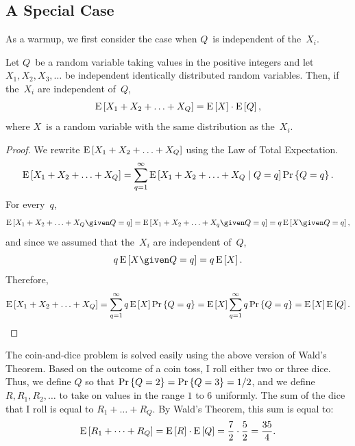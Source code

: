 \documentclass[11pt,twoside]{article}
\begin{document}
\subsection{A Special Case}

As a warmup, we first consider the case when $Q$~is independent of
the~$X_i$.
\begin{theorem}
  Let $Q$~be a random variable taking values in the positive integers
  and let $X_1, X_2, X_3, \ldots$ be independent identically
  distributed random variables. Then, if the~$X_i$ are independent
  of~$Q$,
  \begin{displaymath}
    \mathop{\textup{E}}\nolimits\left[X_1 + X_2 + \ldots + X_Q\right] = \mathop{\textup{E}}\nolimits\left[X\right] \cdot \mathop{\textup{E}}\nolimits\left[Q\right],
  \end{displaymath}
  where $X$~is a random variable with the same distribution as
  the~$X_i$.
\end{theorem}
\begin{proof}
  We rewrite $\mathop{\textup{E}}\nolimits\left[X_1 + X_2 + \ldots + X_Q\right]$ using the Law of Total
  Expectation.
  \begin{displaymath}
    \mathop{\textup{E}}\nolimits\left[X_1 + X_2 + \ldots + X_Q\right]
    =
    \sum_{q=1}^{\infty} \mathop{\textup{E}}\nolimits\left[X_1 + X_2 + \ldots + X_Q\mid Q = q\right] \mathop{\textup{Pr}}\nolimits\left\{Q = q\right\}.
  \end{displaymath}
  For every~$q$,
  \begin{displaymath}
    \expect{X_1 + X_2 + \ldots + X_Q \given Q = q} = 
    \expect{X_1 + X_2 + \ldots + X_q \given Q = q} = q \expect{X \given Q = q},
  \end{displaymath}
  and since we assumed that the~$X_i$ are independent of~$Q$,
  \begin{displaymath}
     q \expect{X \given Q = q} = q \expect{X}.
  \end{displaymath}
  Therefore,
  \begin{displaymath}
    \mathop{\textup{E}}\nolimits\left[X_1 + X_2 + \ldots + X_Q\right]
    =
    \sum_{q=1}^{\infty} q \mathop{\textup{E}}\nolimits\left[X\right] \mathop{\textup{Pr}}\nolimits\left\{Q = q\right\}
    =
    \mathop{\textup{E}}\nolimits\left[X\right] \sum_{q=1}^{\infty} q \mathop{\textup{Pr}}\nolimits\left\{Q = q\right\}
    =
    \mathop{\textup{E}}\nolimits\left[X\right] \mathop{\textup{E}}\nolimits\left[Q\right].
  \end{displaymath}
\end{proof}
\begin{example}  
  \label{ex:coin-and-dice}
  The coin-and-dice problem is solved easily using the above version
  of Wald's Theorem.  Based on the outcome of a coin toss, I roll
  either two or three dice.  Thus, we define $Q$ so that $\mathop{\textup{Pr}}\nolimits\left\{Q = 2\right\} =
  \mathop{\textup{Pr}}\nolimits\left\{Q = 3\right\} = 1/2$, and we define $R, R_1, R_2, \ldots$ to
  take on values in the range $1$ to $6$ uniformly.  The sum of the
  dice that I roll is equal to $R_1 + \ldots + R_Q$.  By Wald's
  Theorem, this sum is equal to:
\[
\mathop{\textup{E}}\nolimits\left[R_1 + \cdots + R_Q\right] = \mathop{\textup{E}}\nolimits\left[R\right] \cdot \mathop{\textup{E}}\nolimits\left[Q\right]
= \frac{7}{2} \cdot \frac{5}{2} = \frac{35}{4}.
\]
\end{example}
\end{document}
